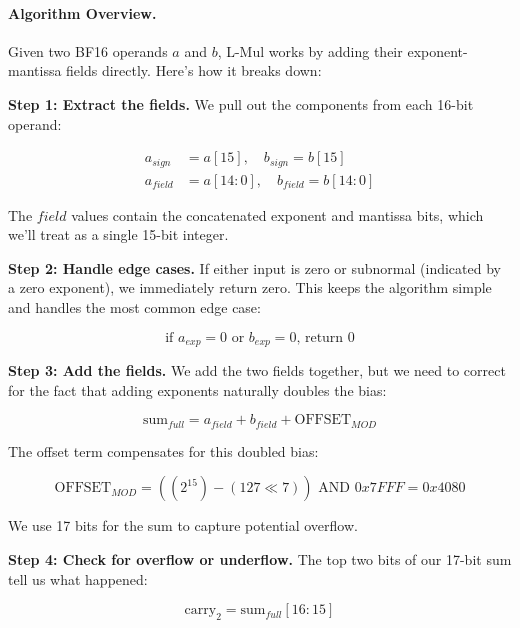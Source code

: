 \documentclass[12pt,letterpaper]{article}
\begin{document}
\paragraph{Algorithm Overview.}

Given two BF16 operands $a$ and $b$, L-Mul works by adding their exponent-mantissa fields directly. Here's how it breaks down:

\textbf{Step 1: Extract the fields.} We pull out the components from each 16-bit operand:

\begin{align}
a_{sign} &= a[15], \quad b_{sign} = b[15] \\
a_{field} &= a[14:0], \quad b_{field} = b[14:0]
\end{align}

The $field$ values contain the concatenated exponent and mantissa bits, which we'll treat as a single 15-bit integer.

\textbf{Step 2: Handle edge cases.} If either input is zero or subnormal (indicated by a zero exponent), we immediately return zero. This keeps the algorithm simple and handles the most common edge case:

\begin{equation}
\text{if } a_{exp} = 0 \text{ or } b_{exp} = 0 \text{, return } 0
\end{equation}

\textbf{Step 3: Add the fields.} We add the two fields together, but we need to correct for the fact that adding exponents naturally doubles the bias:

\begin{equation}
\text{sum}_{full} = a_{field} + b_{field} + \text{OFFSET}_{MOD}
\label{eq:lmul_addition}
\end{equation}

The offset term compensates for this doubled bias:

\begin{equation}
\text{OFFSET}_{MOD} = ((2^{15}) - (127 \ll 7)) \text{ AND } 0x7FFF = 0x4080
\end{equation}

We use 17 bits for the sum to capture potential overflow.

\textbf{Step 4: Check for overflow or underflow.} The top two bits of our 17-bit sum tell us what happened:

\begin{equation}
\text{carry}_2 = \text{sum}_{full}[16:15]
\end{equation}
\end{document}
